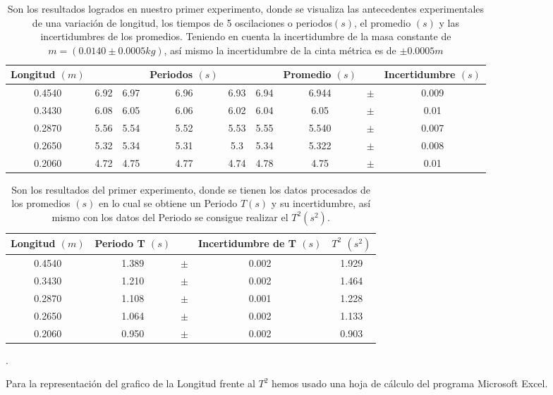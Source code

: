 \documentclass[10pt,a4paper]{article}
\begin{document}
\begin{table}[ht]
	\centering
	\begin{tabular}{c c c c c c c c c}
		
		\hline\hline 
		
Longitud $(m)$ & & & Periodos $(s)$& &  & Promedio $(s)$  & & Incertidumbre $(s)$  \\		
\hline\hline	
		
		0.4540&6.92&6.97&6.96&6.93&6.94&6.944&$\pm$& 0.009\\
		0.3430&6.08&6.05&6.06&6.02&6.04&6.05 &$\pm$& 0.01\\ 
		0.2870&5.56&5.54&5.52&5.53&5.55&5.540&$\pm$& 0.007\\
		0.2650&5.32&5.34&5.31&5.3&5.34&5.322 &$\pm$& 0.008\\
		0.2060&4.72&4.75&4.77&4.74&4.78&4.75 &$\pm$& 0.01\\ [0.5ex]
		\hline	
	\end{tabular}
	\caption{Son los resultados logrados en nuestro primer experimento, donde se visualiza las antecedentes experimentales de una variación de longitud, los tiempos de 5 oscilaciones o periodos$(s)$, el promedio $(s)$ y las incertidumbres de los promedios. Teniendo en cuenta la incertidumbre de la masa constante de $ m= (0.0140\pm 0.0005kg)$, así mismo la incertidumbre de la cinta métrica es de $ \pm 0.0005m$}
	\label{tabla de longitudes}
	
\end{table}

\begin{table}[ht]
	\centering
	\begin{tabular}{c c c c c }
		
		\hline\hline 
		
		Longitud $(m)$ & Periodo T  $(s)$& &  Incertidumbre de T $(s)$ & $T^{2}$ $(s^2)$ \\ 
		
		\hline\hline	
		
		0.4540&1.389&$\pm$&0.002&1.929\\
		0.3430&1.210&$\pm$&0.002&1.464\\
		0.2870&1.108&$\pm$&0.001&1.228\\
		0.2650&1.064&$\pm$&0.002&1.133\\
		0.2060&0.950&$\pm$&0.002&0.903\\ [0.5ex]
		\hline	
	\end{tabular}
	\caption{Son los resultados del primer experimento, donde se tienen los datos procesados de los promedios $(s)$ en lo cual se obtiene un Periodo $T(s)$ y su incertidumbre, así mismo con los datos del Periodo se consigue realizar el $T^2(s^2)$.}.
	\label{tabla de longitudes procesado}
	
\end{table}
Para la representación del grafico de la Longitud frente al $T^{2}$ hemos usado una hoja de cálculo del programa Microsoft Excel.
\end{document}
